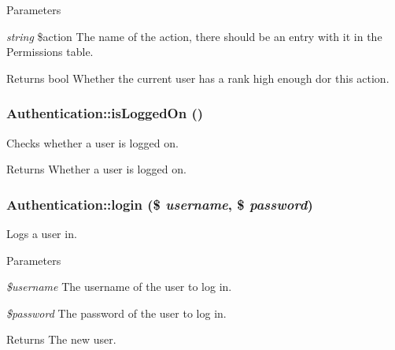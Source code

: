 \begin{DoxyParams}{Parameters}
\item[{\em string}]\$action The name of the action, there should be an entry with it in the Permissions table.\end{DoxyParams}
\begin{DoxyReturn}{Returns}
bool Whether the current user has a rank high enough dor this action. 
\end{DoxyReturn}
\hypertarget{classAuthentication_ad311beb355ff37fd815c0141cc7727f3}{
\subsubsection[{isLoggedOn}]{\setlength{\rightskip}{0pt plus 5cm}Authentication::isLoggedOn ()}}
\label{classAuthentication_ad311beb355ff37fd815c0141cc7727f3}
Checks whether a user is logged on.

\begin{DoxyReturn}{Returns}
Whether a user is logged on. 
\end{DoxyReturn}
\hypertarget{classAuthentication_a505c6a692893f694cc2d63a102a03338}{
\subsubsection[{login}]{\setlength{\rightskip}{0pt plus 5cm}Authentication::login (\$ {\em username}, \/  \$ {\em password})}}
\label{classAuthentication_a505c6a692893f694cc2d63a102a03338}
Logs a user in.


\begin{DoxyParams}{Parameters}
\item[{\em \$username}]The username of the user to log in. \item[{\em \$password}]The password of the user to log in.\end{DoxyParams}
\begin{DoxyReturn}{Returns}
The new user.
\end{DoxyReturn}

